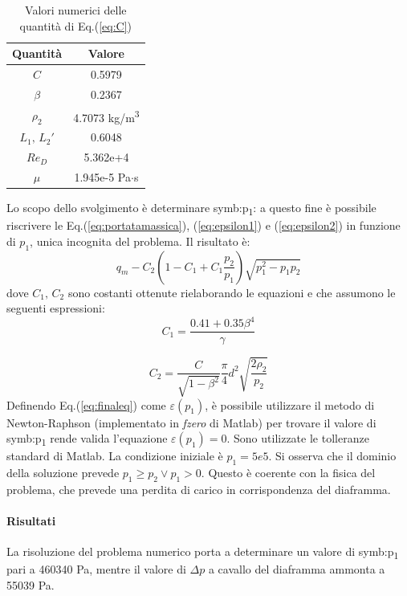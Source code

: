 \begin{table}[H]
	\centering
	\begin{tabular}{c|c}
		\toprule
		\toprule
		\textbf{Quantità} & \textbf{Valore}\\
		\midrule
		\midrule
		$C$ & 0.5979\\
		\midrule
		$\beta$ & 0.2367\\
		\midrule
		$\rho_2$ & 4.7073 kg/m\textsuperscript{3}\\
		\midrule
		$L_1,\,L_2'$ & 0.6048\\
		\midrule
		$Re_D$ & 5.362e+4\\
		\midrule
		$\mu$ & 1.945e-5 Pa$\cdot$s\\
		\bottomrule
		\bottomrule
	\end{tabular}
\caption{Valori numerici delle quantità di Eq.(\ref{eq:C})}
\label{tab:valoriC}
\end{table}

Lo scopo dello svolgimento è determinare \gls{symb:p}\textsubscript{1}: a questo fine è possibile riscrivere le Eq.(\ref{eq:portatamassica}), (\ref{eq:epsilon1}) e (\ref{eq:epsilon2}) in funzione di $p_1$, unica incognita del problema. 
Il risultato è:
\begin{equation}
	q_m-C_2(1-C_1+C_1 \frac{p_2}{p_1}) \sqrt{p_1^2-p_1 p_2} \label{eq:finaleq}
\end{equation}
dove $ C_1,\, C_2$ sono costanti ottenute rielaborando le equazioni e che assumono le seguenti espressioni:
\begin{equation}
	C_1 = \frac{0.41 + 0.35 \beta^4}{\gamma}
\end{equation}

\begin{equation}
		C_2 = \frac{C}{\sqrt{1-\beta^2}} \frac{\pi}{4} d^2 \sqrt{\frac{2 \rho_2}{p_2}}
\end{equation}
Definendo Eq.(\ref{eq:finaleq}) come $\varepsilon (p_1) $, è possibile utilizzare il metodo di Newton-Raphson (implementato in \textit{fzero} di Matlab) per trovare il valore di \gls{symb:p}\textsubscript{1} rende valida l'equazione $\varepsilon (p_1) = 0$. Sono utilizzate le tolleranze standard di Matlab. La condizione iniziale è $p_1 = 5e5$. Si osserva che il dominio della soluzione prevede $p_1 \geqslant p_2 \vee p_1 > 0$. Questo è coerente con la fisica del problema, che prevede una perdita di carico in corrispondenza del diaframma. 

\paragraph{Risultati}
La risoluzione del problema numerico porta a determinare un valore di \gls{symb:p}\textsubscript{1} pari a 460340 Pa, mentre il valore di $\Delta p$ a cavallo del diaframma ammonta a 55039 Pa. 

